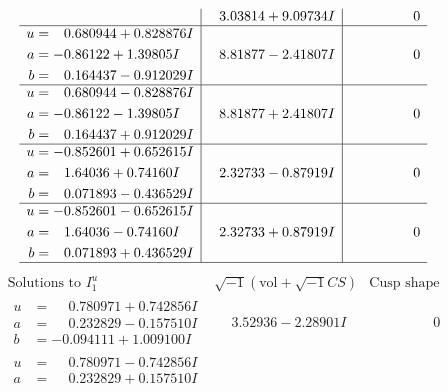 \documentclass[1p]{elsarticle_modified}
\theoremstyle{definition}
\newcommand{\I}{\sqrt{-1}}
\begin{document}
$$\begin{array}{c|c|c}
 & \phantom{-}3.03814 + 9.09734 I & \phantom{-0.000000 } 0 \\ \hline\begin{aligned}
u &= \phantom{-}0.680944 + 0.828876 I \\
a &= -0.86122 + 1.39805 I \\
b &= \phantom{-}0.164437 - 0.912029 I\end{aligned}
 & \phantom{-}8.81877 - 2.41807 I & \phantom{-0.000000 } 0 \\ \hline\begin{aligned}
u &= \phantom{-}0.680944 - 0.828876 I \\
a &= -0.86122 - 1.39805 I \\
b &= \phantom{-}0.164437 + 0.912029 I\end{aligned}
 & \phantom{-}8.81877 + 2.41807 I & \phantom{-0.000000 } 0 \\ \hline\begin{aligned}
u &= -0.852601 + 0.652615 I \\
a &= \phantom{-}1.64036 + 0.74160 I \\
b &= \phantom{-}0.071893 - 0.436529 I\end{aligned}
 & \phantom{-}2.32733 - 0.87919 I & \phantom{-0.000000 } 0 \\ \hline\begin{aligned}
u &= -0.852601 - 0.652615 I \\
a &= \phantom{-}1.64036 - 0.74160 I \\
b &= \phantom{-}0.071893 + 0.436529 I\end{aligned}
 & \phantom{-}2.32733 + 0.87919 I & \phantom{-0.000000 } 0\\
 \hline 
 \end{array}$$\newpage$$\begin{array}{c|c|c}  
\text{Solutions to }I^u_{1}& \I (\text{vol} + \sqrt{-1}CS) & \text{Cusp shape}\\
 \hline 
\begin{aligned}
u &= \phantom{-}0.780971 + 0.742856 I \\
a &= \phantom{-}0.232829 - 0.157510 I \\
b &= -0.094111 + 1.009100 I\end{aligned}
 & \phantom{-}3.52936 - 2.28901 I & \phantom{-0.000000 } 0 \\ \hline\begin{aligned}
u &= \phantom{-}0.780971 - 0.742856 I \\
a &= \phantom{-}0.232829 + 0.157510 I \\

\end{aligned}
\end{array}$$
\end{document}
